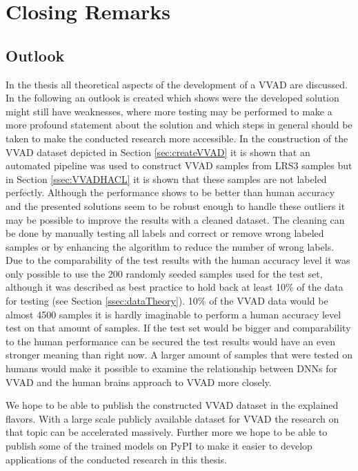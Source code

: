 \chapter{Closing Remarks}
\label{cha:Closing}
\section{Outlook}
In the thesis all theoretical aspects of the development of a VVAD are discussed.
In the following an outlook is created which shows were the developed solution might still have weaknesses, where more testing may be performed to make a more profound statement about the solution and which steps in general should be taken to make the conducted research more accessible.
In the construction of the VVAD dataset depicted in Section \ref{sec:createVVAD} it is shown that an automated pipeline was used to construct VVAD samples from LRS3 samples but in Section \ref{ssec:VVADHACL} it is shown that these samples are not labeled perfectly.
Although the performance shows to be better than human accuracy and the presented solutions seem to be robust enough to handle these outliers it may be possible to improve the results with a cleaned dataset.
The cleaning can be done by manually testing all labels and correct or remove wrong labeled samples or by enhancing the algorithm to reduce the number of wrong labels.
Due to the comparability of the test results with the human accuracy level it was only possible to use the 200 randomly seeded samples used for the test set, although it was described as best practice to hold back at least 10\% of the data for testing (see Section \ref{ssec:dataTheory}).
10\% of the VVAD data would be almost 4500 samples it is hardly imaginable to perform a human accuracy level test on that amount of samples.
If the test set would be bigger and comparability to the human performance can be secured the test results would have an even stronger meaning than right now. 
A larger amount of samples that were tested on humans would make it possible to examine the relationship between DNNs for VVAD and the human brains approach to VVAD more closely.

We hope to be able to publish the constructed VVAD dataset in the explained flavors.
With a large scale publicly available dataset for VVAD the research on that topic can be accelerated massively.
Further more we hope to be able to publish some of the trained models on PyPI \cite{PyPI} to make it easier to develop applications of the conducted research in this thesis.

